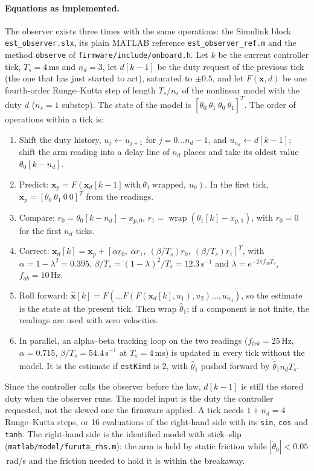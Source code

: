 \documentclass[a4paper,11pt]{article}
\begin{document}
\paragraph{Equations as implemented.} The observer exists three times with the same operations: the Simulink block \nolinkurl{est_observer.slx}, its plain MATLAB reference \nolinkurl{est_observer_ref.m} and the method \texttt{observe} of \nolinkurl{firmware/include/onboard.h}. Let $k$ be the current controller tick, $T_s = 4$\,ms and $n_d = 3$, let $d[k-1]$ be the duty request of the previous tick (the one that has just started to act), saturated to $\pm0.5$, and let $F(\mathbf{x}, d)$ be one fourth-order Runge--Kutta step of length $T_s/n_s$ of the nonlinear model with the duty $d$ ($n_s = 1$ substep). The state of the model is $[\theta_0\ \theta_1\ \dot\theta_0\ \dot\theta_1]^T$. The order of operations within a tick is:
\begin{enumerate}
  \item Shift the duty history, $u_j \leftarrow u_{j+1}$ for $j = 0 \dots n_d - 1$, and $u_{n_d} \leftarrow d[k-1]$; shift the arm reading into a delay line of $n_d$ places and take its oldest value $\theta_0[k-n_d]$.
  \item Predict: $\mathbf{x}_p = F(\mathbf{x}_d[k-1]\,\text{with}\ \theta_1\ \text{wrapped},\ u_0)$. In the first tick, $\mathbf{x}_p = [\theta_0\ \theta_1\ 0\ 0]^T$ from the readings.
  \item Compare: $r_0 = \theta_0[k-n_d] - x_{p,0}$, $r_1 = \operatorname{wrap}(\theta_1[k] - x_{p,1})$, with $r_0 = 0$ for the first $n_d$ ticks.
  \item Correct: $\mathbf{x}_d[k] = \mathbf{x}_p + [\alpha r_0,\ \alpha r_1,\ (\beta/T_s) r_0,\ (\beta/T_s) r_1]^T$, with $\alpha = 1 - \lambda^2 = 0.395$, $\beta/T_s = (1-\lambda)^2/T_s = 12.3\,\mathrm{s^{-1}}$ and $\lambda = e^{-2\pi f_{ab}T_s}$, $f_{ab} = 10$\,Hz.
  \item Roll forward: $\hat{\mathbf{x}}[k] = F(\dots F(F(\mathbf{x}_d[k], u_1), u_2) \dots, u_{n_d})$, so the estimate is the state at the present tick. Then wrap $\hat\theta_1$; if a component is not finite, the readings are used with zero velocities.
  \item In parallel, an alpha--beta tracking loop on the two readings ($f_{trk} = 25$\,Hz, $\alpha = 0.715$, $\beta/T_s = 54.4\,\mathrm{s^{-1}}$ at $T_s = 4$\,ms) is updated in every tick without the model. It is the estimate if \texttt{estKind} is 2, with $\hat\theta_1$ pushed forward by $\dot{\hat\theta}_1 n_d T_s$.
\end{enumerate}
Since the controller calls the observer before the law, $d[k-1]$ is still the stored duty when the observer runs. The model input is the duty the controller requested, not the slewed one the firmware applied. A tick needs $1 + n_d = 4$ Runge--Kutta steps, or 16 evaluations of the right-hand side with its \texttt{sin}, \texttt{cos} and \texttt{tanh}. The right-hand side is the identified model with stick--slip (\nolinkurl{matlab/model/furuta_rhs.m}): the arm is held by static friction while $|\dot\theta_0| < 0.05$\,rad/s and the friction needed to hold it is within the breakaway.
\end{document}
